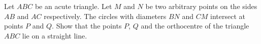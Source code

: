 Let $ABC$ be an acute triangle. Let $M$ and $N$ be two arbitrary points on the sides $AB$ and $AC$ respectively.
The circles with diameters $BN$ and $CM$ intersect at points $P$ and $Q$.
Show that the points $P$, $Q$ and the orthocentre of the triangle $ABC$ lie on a straight line.